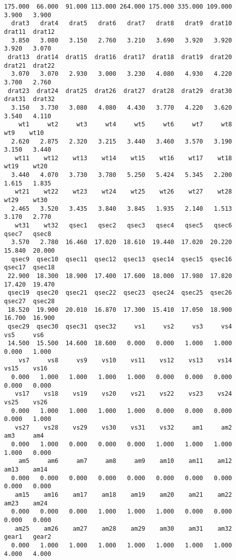 \documentclass[11pt]{article}
\begin{document}
\begin{Verbatim}[commandchars=\\\{\}]
175.000  66.000  91.000 113.000 264.000 175.000 335.000 109.000   3.900   3.900 
  drat3   drat4   drat5   drat6   drat7   drat8   drat9  drat10  drat11  drat12 
  3.850   3.080   3.150   2.760   3.210   3.690   3.920   3.920   3.920   3.070 
 drat13  drat14  drat15  drat16  drat17  drat18  drat19  drat20  drat21  drat22 
  3.070   3.070   2.930   3.000   3.230   4.080   4.930   4.220   3.700   2.760 
 drat23  drat24  drat25  drat26  drat27  drat28  drat29  drat30  drat31  drat32 
  3.150   3.730   3.080   4.080   4.430   3.770   4.220   3.620   3.540   4.110 
    wt1     wt2     wt3     wt4     wt5     wt6     wt7     wt8     wt9    wt10 
  2.620   2.875   2.320   3.215   3.440   3.460   3.570   3.190   3.150   3.440 
   wt11    wt12    wt13    wt14    wt15    wt16    wt17    wt18    wt19    wt20 
  3.440   4.070   3.730   3.780   5.250   5.424   5.345   2.200   1.615   1.835 
   wt21    wt22    wt23    wt24    wt25    wt26    wt27    wt28    wt29    wt30 
  2.465   3.520   3.435   3.840   3.845   1.935   2.140   1.513   3.170   2.770 
   wt31    wt32   qsec1   qsec2   qsec3   qsec4   qsec5   qsec6   qsec7   qsec8 
  3.570   2.780  16.460  17.020  18.610  19.440  17.020  20.220  15.840  20.000 
  qsec9  qsec10  qsec11  qsec12  qsec13  qsec14  qsec15  qsec16  qsec17  qsec18 
 22.900  18.300  18.900  17.400  17.600  18.000  17.980  17.820  17.420  19.470 
 qsec19  qsec20  qsec21  qsec22  qsec23  qsec24  qsec25  qsec26  qsec27  qsec28 
 18.520  19.900  20.010  16.870  17.300  15.410  17.050  18.900  16.700  16.900 
 qsec29  qsec30  qsec31  qsec32     vs1     vs2     vs3     vs4     vs5     vs6 
 14.500  15.500  14.600  18.600   0.000   0.000   1.000   1.000   0.000   1.000 
    vs7     vs8     vs9    vs10    vs11    vs12    vs13    vs14    vs15    vs16 
  0.000   1.000   1.000   1.000   1.000   0.000   0.000   0.000   0.000   0.000 
   vs17    vs18    vs19    vs20    vs21    vs22    vs23    vs24    vs25    vs26 
  0.000   1.000   1.000   1.000   1.000   0.000   0.000   0.000   0.000   1.000 
   vs27    vs28    vs29    vs30    vs31    vs32     am1     am2     am3     am4 
  0.000   1.000   0.000   0.000   0.000   1.000   1.000   1.000   1.000   0.000 
    am5     am6     am7     am8     am9    am10    am11    am12    am13    am14 
  0.000   0.000   0.000   0.000   0.000   0.000   0.000   0.000   0.000   0.000 
   am15    am16    am17    am18    am19    am20    am21    am22    am23    am24 
  0.000   0.000   0.000   1.000   1.000   1.000   0.000   0.000   0.000   0.000 
   am25    am26    am27    am28    am29    am30    am31    am32   gear1   gear2 
  0.000   1.000   1.000   1.000   1.000   1.000   1.000   1.000   4.000   4.000 

\end{Verbatim}
\end{document}
